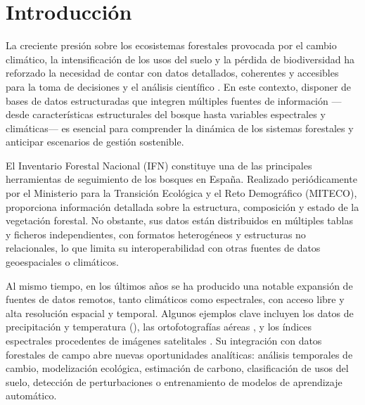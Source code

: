 \section{Introducción}


La creciente presión sobre los ecosistemas forestales provocada por el cambio climático, la intensificación de los usos del suelo y la pérdida de biodiversidad ha reforzado la necesidad de contar con datos detallados, coherentes y accesibles para la toma de decisiones y el análisis científico \cite{cmnucc1992, kioto1997}. En este contexto, disponer de bases de datos estructuradas que integren múltiples fuentes de información —desde características estructurales del bosque hasta variables espectrales y climáticas— es esencial para comprender la dinámica de los sistemas forestales y anticipar escenarios de gestión sostenible.

\medskip

El Inventario Forestal Nacional (IFN) \cite{ifn} constituye una de las principales herramientas de seguimiento de los bosques en España. Realizado periódicamente por el Ministerio para la Transición Ecológica y el Reto Demográfico (MITECO), proporciona información detallada sobre la estructura, composición y estado de la vegetación forestal. No obstante, sus datos están distribuidos en múltiples tablas y ficheros independientes, con formatos heterogéneos y estructuras no relacionales, lo que limita su interoperabilidad con otras fuentes de datos geoespaciales o climáticos.

\medskip

Al mismo tiempo, en los últimos años se ha producido una notable expansión de fuentes de datos remotos, tanto climáticos como espectrales, con acceso libre y alta resolución espacial y temporal. Algunos ejemplos clave incluyen los datos de precipitación y temperatura (\cite{copernicus_era5_land_daily}), las ortofotografías aéreas \cite{ign_pnoa}, y los índices espectrales procedentes de imágenes satelitales \cite{landsat5_data, landsat7_data, sentinel_hub_ndii, eos_indices_vegetacion}. Su integración con datos forestales de campo abre nuevas oportunidades analíticas: análisis temporales de cambio, modelización ecológica, estimación de carbono, clasificación de usos del suelo, detección de perturbaciones o entrenamiento de modelos de aprendizaje automático.

